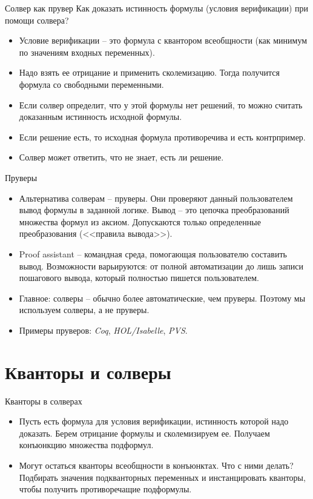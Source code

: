 \documentclass[hyperref={unicode=true}]{beamer}
\begin{document}
    \begin{frame}{Солвер как прувер}
    Как доказать истинность формулы (условия верификации) при помощи солвера?
    \begin{itemize}
    \item
    Условие верификации -- это формула с квантором всеобщности (как минимум
    по значениям входных переменных).
    \item
    Надо взять ее отрицание
    и применить сколемизацию. Тогда получится формула со свободными
    переменными.
    \item
    Если солвер определит, что у этой формулы нет решений,
    то можно считать доказанным истинность исходной формулы.
    \item
    Если решение есть, то исходная формула противоречива и есть
    контрпример.
    \item
    Солвер может ответить, что не знает, есть ли решение.
    \end{itemize}
    \end{frame}

    \begin{frame}{Пруверы}
    \begin{itemize}
    \item
    Альтернатива солверам -- пруверы. Они проверяют данный пользователем
    вывод формулы в заданной логике. Вывод -- это цепочка преобразований
    множества формул из аксиом. Допускаются только определенные
    преобразования (<<правила вывода>>).
    \item
    Proof assistant -- командная среда, помогающая пользователю
    составить вывод. Возможности варьируются: от полной автоматизации
    до лишь записи пошагового вывода, который полностью пишется пользователем.
    \item
    Главное: солверы -- обычно более автоматические, чем пруверы. Поэтому
    мы используем солверы, а не пруверы.
    \item
    Примеры пруверов: \textsl{Coq}, \textsl{HOL/Isabelle}, \textsl{PVS}.
    \end{itemize}
    \end{frame}

    \section{Кванторы и солверы}

    \begin{frame}{Кванторы в солверах}
    \begin{itemize}
    \item
    Пусть есть формула для условия верификации,
    истинность которой надо доказать. Берем отрицание формулы и
    сколемизируем ее. Получаем конъюнкцию множества подформул.
    \item
    Могут остаться кванторы всеобщности в конъюнктах. Что с ними делать?
    Подбирать значения подкванторных переменных и инстанцировать кванторы,
    чтобы получить противоречащие подформулы.
    \end{itemize}
    \end{frame}
\end{document}
